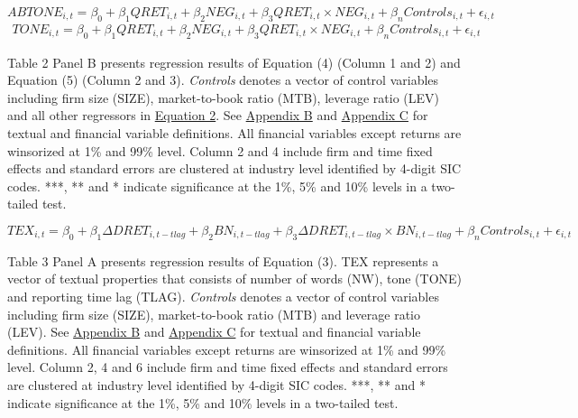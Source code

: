 \newpage

\setcounter{equation}{3}
\begin{equation}
ABTONE_{i,t}=\beta_0+\beta_1QRET_{i,t}+\beta_2NEG_{i,t}+\beta_3QRET_{i,t}\times NEG_{i,t}+\beta_nControls_{i,t}+\epsilon_{i,t}
\end{equation}
\begin{equation}
\begin{split}
TONE_{i,t}=\beta_0+\beta_1QRET_{i,t}+\beta_2NEG_{i,t}+\beta_3QRET_{i,t}\times NEG_{i,t}+\beta_nControls_{i,t}+\epsilon_{i,t}
\end{split}
\end{equation}

Table 2 Panel B presents regression results of Equation (4) (Column 1 and 2) and Equation (5) (Column 2 and 3). \textit{Controls} denotes a vector of control variables including firm size (SIZE), market-to-book ratio (MTB), leverage ratio (LEV) and all other regressors in \hyperref[eq2]{Equation 2}. See \hyperref[appb]{Appendix B} and \hyperref[appc]{Appendix C} for textual and financial variable definitions. All financial variables except returns are winsorized at 1\% and 99\% level. Column 2 and 4 include firm and time fixed effects and standard errors are clustered at industry level identified by 4-digit SIC codes. ***, ** and * indicate significance at the 1\%, 5\% and 10\% levels in a two-tailed test.

\newpage

\setcounter{equation}{2}
\begin{equation}
TEX_{i,t}=\beta_0+\beta_1\Delta DRET_{i,t-tlag}+\beta_2BN_{i,t-tlag}+\beta_3\Delta DRET_{i,t-tlag}\times BN_{i,t-tlag}+\beta_nControls_{i,t}+\epsilon_{i,t}
\end{equation}

Table 3 Panel A presents regression results of Equation (3). TEX represents a vector of textual properties that consists of number of words (NW), tone (TONE) and reporting time lag (TLAG). \textit{Controls} denotes a vector of control variables including firm size (SIZE), market-to-book ratio (MTB) and leverage ratio (LEV). See \hyperref[appb]{Appendix B} and \hyperref[appc]{Appendix C} for textual and financial variable definitions. All financial variables except returns are winsorized at 1\% and 99\% level. Column 2, 4 and 6 include firm and time fixed effects and standard errors are clustered at industry level identified by 4-digit SIC codes. ***, ** and * indicate significance at the 1\%, 5\% and 10\% levels in a two-tailed test.

